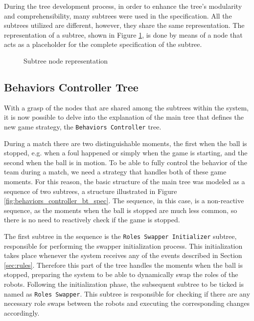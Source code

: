 During the tree development process, in order to enhance the tree's modularity and comprehensibility, many subtrees were used in the specification. All the subtrees utilized are different, however, they share the same representation. The representation of a subtree, shown in Figure \ref{fig:subtrees_spec}, is done by means of a node that acts as a placeholder for the complete specification of the subtree.

\begin{figure}[!h]
    \centering
    \scalebox{1.} {
        \begin{forest}
        \end{forest}
    }
    \caption{Subtree node representation}
    \label{fig:subtrees_spec}
\end{figure}

\subsection{Behaviors Controller Tree}

With a grasp of the nodes that are shared among the subtrees within the system, it is now possible to delve into the explanation of the main tree that defines the new game strategy, the \texttt{Behaviors Controller} tree.

During a match there are two distinguishable moments, the first when the ball is stopped, e.g. when a foul happened or simply when the game is starting, and the second when the ball is in motion. To be able to fully control the behavior of the team during a match, we need a strategy that handles both of these game moments. For this reason, the basic structure of the main tree was modeled as a sequence of two subtrees, a structure illustrated in Figure \ref{fig:behaviors_controller_bt_spec}. The sequence, in this case, is a non-reactive sequence, as the moments when the ball is stopped are much less common, so there is no need to reactively check if the game is stopped.

The first subtree in the sequence is the \texttt{Roles Swapper Initializer} subtree, responsible for performing the swapper initialization process. This initialization takes place whenever the system receives any of the events described in Section \ref{sec:rules}. Therefore this part of the tree handles the moments when the ball is stopped, preparing the system to be able to dynamically swap the roles of the robots. Following the initialization phase, the subsequent subtree to be ticked is named as \texttt{Roles Swapper}. This subtree is responsible for checking if there are any necessary role swaps between the robots and executing the corresponding changes accordingly.

